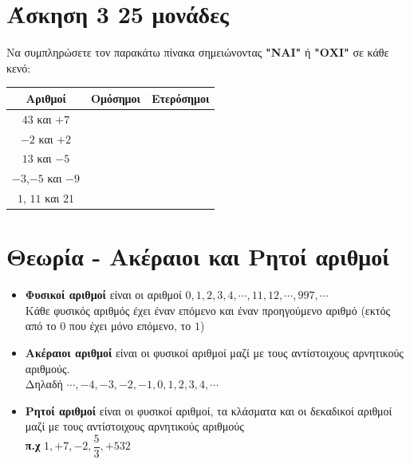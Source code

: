\documentclass[a4paper,10pt]{report}
\begin{document}
\section*{Άσκηση 3  \hfill \small{25 μονάδες}}
Να συμπληρώσετε τον παρακάτω πίνακα σημειώνοντας \textbf{"ΝΑΙ"} ή \textbf{"ΟΧΙ"} σε κάθε κενό:
\begin{center}
\begin{tabular}{|c|c|c|}
\hline
\textbf{Αριθμοί}  & \textbf{Ομόσημοι} & \textbf{Ετερόσημοι}\\ \hline
$43$ και $+7$ &  & \\ \hline
$-2$ και $+2$ &  & \\ \hline
$13$ και $-5$ &  & \\ \hline 
$-3$,$-5$ και $-9$ &  & \\ \hline
$1$, $11$ και $21$ &  & \\ \hline
\end{tabular}
\end{center}


\section*{Θεωρία - Ακέραιοι και Ρητοί αριθμοί\hfill \small{}}
\begin{itemize}
 \item \textbf{Φυσικοί αριθμοί} είναι οι αριθμοί $0,1,2,3,4,\cdots ,11,12,\cdots , 997, \cdots$ \\
       Κάθε φυσικός αριθμός έχει έναν επόμενο και έναν προηγούμενο αριθμό (εκτός από το $0$ που έχει 
       μόνο επόμενο, το $1$)
 \item \textbf{Ακέραιοι αριθμοί} είναι οι φυσικοί αριθμοί μαζί με τους αντίστοιχους αρνητικούς αριθμούς.\\
        Δηλαδή $\cdots ,-4,-3,-2,-1,0,1,2,3,4,\cdots$
\item \textbf{Ρητοί αριθμοί} είναι οι φυσικοί αριθμοί, τα κλάσματα και οι δεκαδικοί αριθμοί μαζί με τους 
      αντίστοιχους αρνητικούς αριθμούς \\
      \textbf{π.χ} $1,+7,-2, \dfrac{5}{3}, +532$
\end{itemize}
\end{document}
